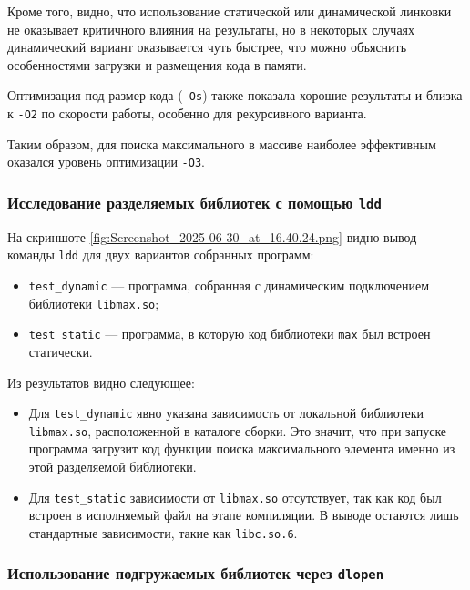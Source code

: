 Кроме того, видно, что использование статической или динамической линковки не оказывает критичного влияния на результаты, но в некоторых случаях динамический вариант оказывается чуть быстрее, что можно объяснить особенностями загрузки и размещения кода в памяти.

Оптимизация под размер кода (\texttt{-Os}) также показала хорошие результаты и близка к \texttt{-O2} по скорости работы, особенно для рекурсивного варианта.

Таким образом, для поиска максимального в массиве наиболее эффективным оказался уровень оптимизации \texttt{-O3}.

\subsubsection{Исследование разделяемых библиотек с помощью \texttt{ldd}}

На скриншоте \ref{fig:Screenshot_2025-06-30_at_16.40.24.png} видно вывод команды \texttt{ldd} для двух вариантов собранных программ:


\begin{itemize}
    \item \texttt{test\_dynamic} — программа, собранная с динамическим подключением библиотеки \texttt{libmax.so};
    \item \texttt{test\_static} — программа, в которую код библиотеки \texttt{max} был встроен статически.
\end{itemize}

Из результатов видно следующее:
\begin{itemize}
    \item Для \texttt{test\_dynamic} явно указана зависимость от локальной библиотеки \texttt{libmax.so}, расположенной в каталоге сборки. Это значит, что при запуске программа загрузит код функции поиска максимального элемента именно из этой разделяемой библиотеки.
    \item Для \texttt{test\_static} зависимости от \texttt{libmax.so} отсутствует, так как код был встроен в исполняемый файл на этапе компиляции. В выводе остаются лишь стандартные зависимости, такие как \texttt{libc.so.6}.
\end{itemize}

\subsubsection{Использование подгружаемых библиотек через \texttt{dlopen}}

